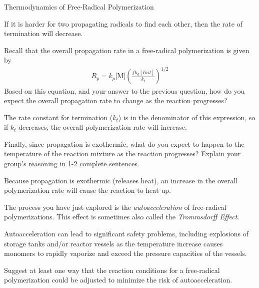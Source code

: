 \begin{activity}{Thermodynamics of Free-Radical Polymerization}
\begin{ctqs}
		\begin{solution}[1in]
			If it is harder for two propagating radicals to find each other, then the rate of termination will decrease.
		\end{solution}
	
	\question Recall that the overall propagation rate in a free-radical polymerization is given by
					\begin{align*}
						R_p = k_p\text{[M]}\left(\frac{fk_d[Init]}{k_t}\right)^{1/2}
					\end{align*}
		Based on this equation, and your answer to the previous question, how do you expect the overall propagation rate to change as the reaction progresses?
	
		\begin{solution}[1in]
			The rate constant for termination ($k_t$) is in the denominator of this expression, so if $k_t$ decreases, the overall polymerization rate will increase.
		\end{solution}
		
	\question Finally, since propagation is exothermic, what do you expect to happen to the temperature of the reaction mixture as the reaction progresses?  Explain your group's reasoning in 1-2 complete sentences.
	
		\begin{solution}[1.5in]
			Because propagation is exothermic (releases heat), an increase in the overall polymerization rate will cause the reaction to heat up.
		\end{solution}
		
\end{ctqs}

	\begin{infobox}
		The process you have just explored is the \emph{autoacceleration} of free-radical polymerizations.  This effect is sometimes also called the \emph{Trommsdorff Effect}.
		
		Autoacceleration can lead to significant safety problems, including explosions of storage tanks and/or reactor vessels as the temperature increase causes monomers to rapidly vaporize and exceed the pressure capacities of the vessels.
		
	\end{infobox}


\begin{ctqs}

	\question Suggest at least one way that the reaction conditions for a free-radical polymerization could be adjusted to minimize the risk of autoacceleration.
	

\end{ctqs}
\end{activity}
